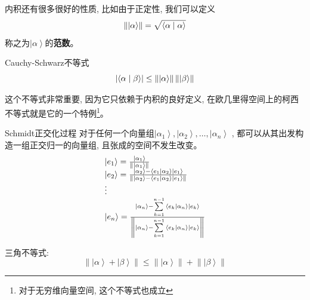 内积还有很多很好的性质, 比如由于正定性, 我们可以定义\[\left\| {\left| \alpha  \right\rangle } \right\| = \sqrt {\left\langle {\alpha }
\mathrel{\left | {\vphantom {\alpha  \alpha }}\right. \kern-\nulldelimiterspace}{\alpha } \right\rangle } \]
称之为$\left| \alpha  \right\rangle $的\textbf{范数}。
\begin{theorem}{Cauchy-Schwarz不等式}
    \begin{equation}
        \left|\left\langle {\alpha }\mathrel{\left | {\vphantom {\alpha  \beta }}\right. \kern-\nulldelimiterspace}{\beta } \right\rangle \right| \le
        \left\| {\left| \alpha  \right\rangle } \right\|\left\| {\left| \beta  \right\rangle } \right\|
    \end{equation}
\end{theorem}
这个不等式非常重要, 因为它只依赖于内积的良好定义, 在欧几里得空间上的柯西不等式就是它的一个特例\footnote[1]{对于无穷维向量空间, 这个不等式也成立}。
\begin{proposition}{Schmidt正交化过程}
    对于任何一个向量组${\left| {{\alpha _1}} \right\rangle  ,\left| {{\alpha _2}} \right\rangle  , \ldots,\left| {{\alpha _n}} \right\rangle }$
    , 都可以从其出发构造一组正交归一的向量组, 且张成的空间不发生改变。
    \[\begin{array}{l}
        \left| {{e_1}} \right\rangle  = \frac{{\left| {{\alpha _1}} \right\rangle }}{{\left\| {\left| {{\alpha _1}} \right\rangle } \right\|}}\\
        \left| {{e_2}} \right\rangle  = \frac{{\left| {{\alpha _2}} \right\rangle  - \left\langle {{{e_1}}}
         \mathrel{\left | {\vphantom {{{e_1}} {{\alpha _2}}}}
         \right. \kern-\nulldelimiterspace}
         {{{\alpha _2}}} \right\rangle \left| {{e_1}} \right\rangle }}{{\left\| {\left| {{\alpha _2}} \right\rangle  - \left\langle {{{e_1}}}
         \mathrel{\left | {\vphantom {{{e_1}} {{\alpha _2}}}}
         \right. \kern-\nulldelimiterspace}
         {{{\alpha _2}}} \right\rangle \left| {{e_1}} \right\rangle } \right\|}}\\
         \vdots \\
        \left| {{e_n}} \right\rangle  = \frac{{\left| {{\alpha _n}} \right\rangle  - \sum\limits_{k = 1}^{n - 1} {\left\langle {{{e_k}}}
         \mathrel{\left | {\vphantom {{{e_k}} {{\alpha _n}}}}
         \right. \kern-\nulldelimiterspace}
         {{{\alpha _n}}} \right\rangle \left| {{e_k}} \right\rangle } }}{{\left\| {\left| {{\alpha _n}} \right\rangle  - \sum\limits_{k = 1}^{n - 1} {\left\langle {{{e_k}}}
         \mathrel{\left | {\vphantom {{{e_k}} {{\alpha _n}}}}
         \right. \kern-\nulldelimiterspace}
         {{{\alpha _n}}} \right\rangle \left| {{e_k}} \right\rangle } } \right\|}}
        \end{array}\]
\end{proposition}
三角不等式:
\[\left\| {\left| \alpha  \right\rangle  + \left| \beta  \right\rangle } \right\| \le \left\| {\left| \alpha  \right\rangle } \right\| + \left\| {\left| \beta  \right\rangle } \right\|\]


